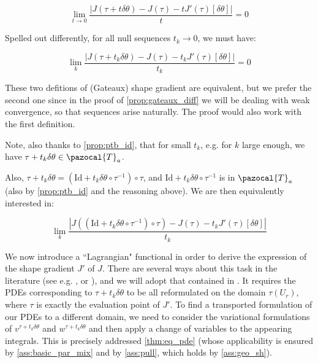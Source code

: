 \documentclass[english,a4paper,10pt,oneside]{scrbook}	%
\theoremstyle{break}
\theoremstyle{remark}
\newcommand{\mR}{\mathbb{R}}
\newcommand{\norm}[1]{\left\lVert#1\right\rVert}
\newcommand{\cT}{\pazocal{T}}
\newcommand{\id}{\text{Id}}
\newcommand{\te}{\theta}
\newcommand{\Te}{\Theta}
\begin{document}
$$\lim_{t \rightarrow 0 }\frac{|J(\tau+t\delta \te)-J(\tau)-t J'(\tau)[\delta \te]|}{t}=0$$

Spelled out differently, for all null sequences $t_k \rightarrow 0$, we must have:


$$\lim_{k}\frac{|J(\tau+t_k \delta \te)-J(\tau)-t_k J'(\tau)[\delta \te]|}{t_k}=0$$


These two defitions of (Gateaux) shape gradient are equivalent, but we prefer the second one since in the proof of \cref{prop:gateaux_diff} we will be dealing with weak convergence, so that sequences arise naturally. The proof would also work with the first definition.

Note, also thanks to \cref{prop:ptb_id}, that for small $t_k$, e.g. for $k$ large enough, we have $\tau + t_k \delta \te \in \cT_a$.




Also, $\tau+t_k \delta \te  = (\id+t_k \delta\te \circ \tau^{-1})\circ \tau$, and $\id+t_k \delta\te \circ \tau^{-1}$ is in $\cT_a$ (also by \cref{prop:ptb_id} and the reasoning above). We are then equivalently interested in:

$$\lim_{k}\frac{|J((\id+t_k \delta\te \circ \tau^{-1})\circ \tau)-J(\tau)-t_k J'(\tau)[\delta \te]|}{t_k}$$


We now introduce a ``Lagrangian" functional in order to derive the expression of the shape gradient $J'$ of $J$. There are several ways about this task in the literature (see e.g. \cite{avg_adj}, \cite{cea} or \cite{lindemann}), and we will adopt that contained in \cite{avg_adj}. It requires the PDEs corresponding to $\tau + t_k \delta \te$ to be all reformulated on the domain $\tau(U_r)$, where $\tau$ is exactly the evaluation point of $J'$. To find a transported formulation of our PDEs to a different domain, we need to consider the variational formulations of $v^{\tau + t_k \delta \te}$ and $w^{\tau+t_k \delta \te}$ and then apply a change of variables to the appearing integrals. This is precisely addressed \cref{thm:eq_pde} (whose applicability is ensured by \cref{ass:basic_par_mix} and by \cref{ass:pull}, which holds by \cref{ass:geo_sh}).
\end{document}
